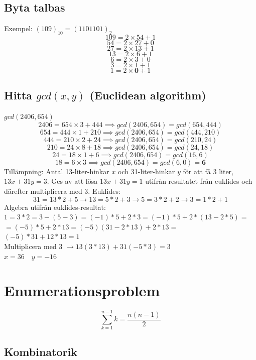 \documentclass{article}
\begin{document}
\begin{multicols}{2}
\subsection{Byta talbas}
\begin{multicols}{2}
Exempel: $(109)_{10} = (1101101)_2$
$$109 = 2 \times 54 + 1$$
$$54 = 2 \times 27 + 0$$
$$27 = 2 \times 13 + 1$$
$$13 = 2 \times 6 + 1$$
$$6 = 2 \times 3 + 0$$
$$3 = 2 \times 1 + 1$$
$$1 = 2 \times \textbf{0} + 1$$
\end{multicols}


\subsection{Hitta $gcd(x,y)$ (Euclidean algorithm)}\label{euclid}
$gcd(2406,654)$
$$2406 = 654 \times 3 + 444 \implies gcd(2406,654) = gcd(654,444)$$
$$654 = 444 \times 1 + 210 \implies gcd(2406,654) = gcd(444,210)$$
$$444 = 210 \times 2 + 24 \implies gcd(2406,654) = gcd(210,24)$$
$$210 = 24 \times 8 + 18 \implies gcd(2406,654) = gcd(24,18)$$
$$24 = 18 \times 1 + 6 \implies gcd(2406,654) = gcd(16,6)$$
$$18 = 6 \times 3 \implies gcd(2406,654) = gcd(6,0) = \textbf{6}$$
\newline
Tillämpning: Antal 13-liter-hinkar $x$ och 31-liter-hinkar $y$ för att få 3 liter, $13x+31y=3$. Ges av att lösa $13x+31y=1$ utifrån resultatet från euklides och därefter multiplicera med 3. Euklides:
$$31=13*2+5 \rightarrow 13=5*2+3 \rightarrow 5=3*2+2 \rightarrow 3=1*2+1$$
Algebra utifrån euklides-resultat:\\
$1=3*2=3-(5-3)=(-1)*5+2*3=(-1)*5+2*(13-2*5)=$\\
$=(-5)*5+2*13=(-5)(31-2*13)+2*13=$\\
$(-5)*31+12*13=1$\\ 
Multiplicera med 3 $\rightarrow 13(3*13)+31(-5*3)=3$\\
$x=36 \quad y=-16$

\section{Enumerationsproblem}
$$\sum_{k=1}^{n-1} k = \frac{n(n-1)}{2}$$

\subsection{Kombinatorik}
\end{multicols}
\end{document}
